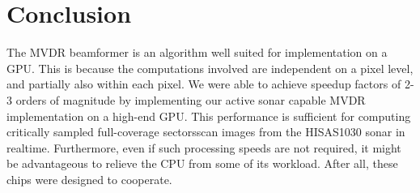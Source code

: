 \documentclass[10pt,a4paper]{article}
\newcommand\1{\vec 1}
\begin{document}
% 
% 
% 


\section{Conclusion}

The \gls{MVDR} beamformer is an algorithm well suited for implementation on a \gls{GPU}. This is because the computations involved are independent on a pixel level, and partially also within each pixel. We were able to achieve speedup factors of 2-3 orders of magnitude by implementing our active sonar capable \gls{MVDR} implementation on a high-end \gls{GPU}. This performance is sufficient for computing critically sampled full-coverage sectorsscan images from the HISAS1030 sonar in realtime. Furthermore, even if such processing speeds are not required, it might be advantageous to relieve the \gls{CPU} from some of its workload. After all, these chips were designed to cooperate.





\end{document}
